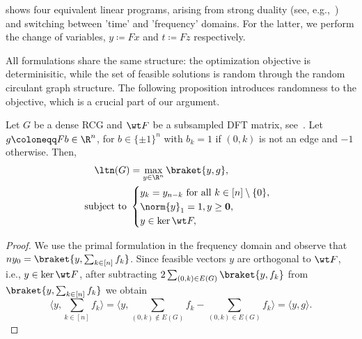  shows four equivalent linear programs, arising from strong duality (see, e.g.,~\cite{bazaraa2011linear}) and switching between 'time' and 'frequency' domains. For the latter, we perform the change of variables, \(y \coloneqq Fx\) and \(t \coloneqq Fz\) respectively.

All formulations share the same structure: the optimization objective is determinisitic,
while the set of feasible solutions is random through the random circulant graph structure.
The following proposition introduces randomness to the objective, which is a crucial part of our argument.
\begin{lemma}
\label{lem:lp_with_g}
Let \(G\) be a dense RCG and \(\wt F\) be a subsampled DFT matrix, see~. Let \(g \coloneqq Fb \in \R^n\), for \(b \in \{\pm 1\}^{n}\) with \(b_k = 1\) if \((0, k)\) is not an edge and \(-1\) otherwise. Then,
    \begin{equation}
\begin{aligned}
    \ltn(G) &= \max_{y \in \R^{n}} \braket{y, g}, \\ \text{ subject to }
    &\begin{cases} y_k = y_{n - k} \text{ for all } k \in [n] \setminus \{0\}, \\
    \norm{y}_1 = 1,
    y \geq \mathbf{0}, \\
    y \in \ker \wt F,
    \end{cases}
\end{aligned}
\end{equation}
\end{lemma}
\begin{proof}
We use the primal formulation in the frequency domain and observe that \(n y_0 = \braket{y, \sum_{k \in [n]} f_k}\).
Since feasible vectors \(y\) are orthogonal to \(\wt F\), i.e., \(y \in \ker \wt F\), after subtracting \(2 \sum_{(0, k) \in E(G)} \braket{y, f_k}\) from \(\braket{y, \sum_{k \in [n]} f_k}\) we obtain
\begin{equation}
\langle y, \sum_{k \in [n]} f_k \rangle = \langle y, \sum_{(0, k) \notin E(G)} f_k - \sum_{(0, k) \in E(G)} f_k \rangle = \langle y, g\rangle.
\end{equation}
\end{proof}

